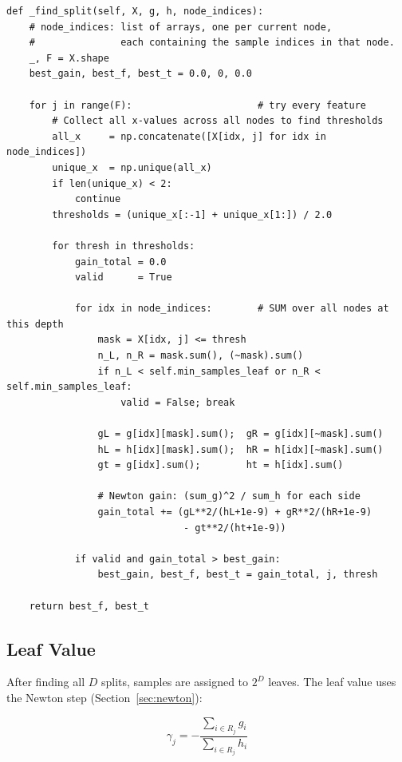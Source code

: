\documentclass[11pt, a4paper]{article}
\begin{document}
\begin{listing}[H]
\caption{Oblivious split search (\texttt{tree.py})}
\begin{verbatim}
def _find_split(self, X, g, h, node_indices):
    # node_indices: list of arrays, one per current node,
    #               each containing the sample indices in that node.
    _, F = X.shape
    best_gain, best_f, best_t = 0.0, 0, 0.0

    for j in range(F):                      # try every feature
        # Collect all x-values across all nodes to find thresholds
        all_x     = np.concatenate([X[idx, j] for idx in node_indices])
        unique_x  = np.unique(all_x)
        if len(unique_x) < 2:
            continue
        thresholds = (unique_x[:-1] + unique_x[1:]) / 2.0

        for thresh in thresholds:
            gain_total = 0.0
            valid      = True

            for idx in node_indices:        # SUM over all nodes at this depth
                mask = X[idx, j] <= thresh
                n_L, n_R = mask.sum(), (~mask).sum()
                if n_L < self.min_samples_leaf or n_R < self.min_samples_leaf:
                    valid = False; break

                gL = g[idx][mask].sum();  gR = g[idx][~mask].sum()
                hL = h[idx][mask].sum();  hR = h[idx][~mask].sum()
                gt = g[idx].sum();        ht = h[idx].sum()

                # Newton gain: (sum_g)^2 / sum_h for each side
                gain_total += (gL**2/(hL+1e-9) + gR**2/(hR+1e-9)
                               - gt**2/(ht+1e-9))

            if valid and gain_total > best_gain:
                best_gain, best_f, best_t = gain_total, j, thresh

    return best_f, best_t
\end{verbatim}
\end{listing}

\subsection{Leaf Value}

After finding all $D$ splits, samples are assigned to $2^D$ leaves.
The leaf value uses the Newton step (Section~\ref{sec:newton}):

\[
\gamma_j = -\frac{\sum_{i \in R_j} g_i}{\sum_{i \in R_j} h_i}
\]
\end{document}
